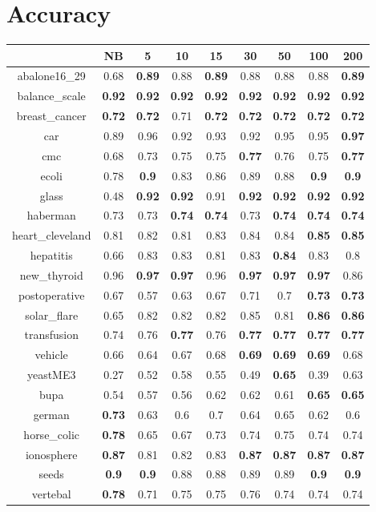 \documentclass{article}%
\begin{document}
%
\normalsize%
\section*{Accuracy}%
\begin{tabular}{c|cccccccc}%
\hline%
&NB&5&10&15&30&50&100&200\\%
\hline%
abalone16\_29&0.68&\textbf{0.89}&0.88&\textbf{0.89}&0.88&0.88&0.88&\textbf{0.89}\\%
\hline%
balance\_scale&\textbf{0.92}&\textbf{0.92}&\textbf{0.92}&\textbf{0.92}&\textbf{0.92}&\textbf{0.92}&\textbf{0.92}&\textbf{0.92}\\%
\hline%
breast\_cancer&\textbf{0.72}&\textbf{0.72}&0.71&\textbf{0.72}&\textbf{0.72}&\textbf{0.72}&\textbf{0.72}&\textbf{0.72}\\%
\hline%
car&0.89&0.96&0.92&0.93&0.92&0.95&0.95&\textbf{0.97}\\%
\hline%
cmc&0.68&0.73&0.75&0.75&\textbf{0.77}&0.76&0.75&\textbf{0.77}\\%
\hline%
ecoli&0.78&\textbf{0.9}&0.83&0.86&0.89&0.88&\textbf{0.9}&\textbf{0.9}\\%
\hline%
glass&0.48&\textbf{0.92}&\textbf{0.92}&0.91&\textbf{0.92}&\textbf{0.92}&\textbf{0.92}&\textbf{0.92}\\%
\hline%
haberman&0.73&0.73&\textbf{0.74}&\textbf{0.74}&0.73&\textbf{0.74}&\textbf{0.74}&\textbf{0.74}\\%
\hline%
heart\_cleveland&0.81&0.82&0.81&0.83&0.84&0.84&\textbf{0.85}&\textbf{0.85}\\%
\hline%
hepatitis&0.66&0.83&0.83&0.81&0.83&\textbf{0.84}&0.83&0.8\\%
\hline%
new\_thyroid&0.96&\textbf{0.97}&\textbf{0.97}&0.96&\textbf{0.97}&\textbf{0.97}&\textbf{0.97}&0.86\\%
\hline%
postoperative&0.67&0.57&0.63&0.67&0.71&0.7&\textbf{0.73}&\textbf{0.73}\\%
\hline%
solar\_flare&0.65&0.82&0.82&0.82&0.85&0.81&\textbf{0.86}&\textbf{0.86}\\%
\hline%
transfusion&0.74&0.76&\textbf{0.77}&0.76&\textbf{0.77}&\textbf{0.77}&\textbf{0.77}&\textbf{0.77}\\%
\hline%
vehicle&0.66&0.64&0.67&0.68&\textbf{0.69}&\textbf{0.69}&\textbf{0.69}&0.68\\%
\hline%
yeastME3&0.27&0.52&0.58&0.55&0.49&\textbf{0.65}&0.39&0.63\\%
\hline%
bupa&0.54&0.57&0.56&0.62&0.62&0.61&\textbf{0.65}&\textbf{0.65}\\%
\hline%
german&\textbf{0.73}&0.63&0.6&0.7&0.64&0.65&0.62&0.6\\%
\hline%
horse\_colic&\textbf{0.78}&0.65&0.67&0.73&0.74&0.75&0.74&0.74\\%
\hline%
ionosphere&\textbf{0.87}&0.81&0.82&0.83&\textbf{0.87}&\textbf{0.87}&\textbf{0.87}&\textbf{0.87}\\%
\hline%
seeds&\textbf{0.9}&\textbf{0.9}&0.88&0.88&0.89&0.89&\textbf{0.9}&\textbf{0.9}\\%
\hline%
vertebal&\textbf{0.78}&0.71&0.75&0.75&0.76&0.74&0.74&0.74\\%
\hline%
\end{tabular}
\end{document}
